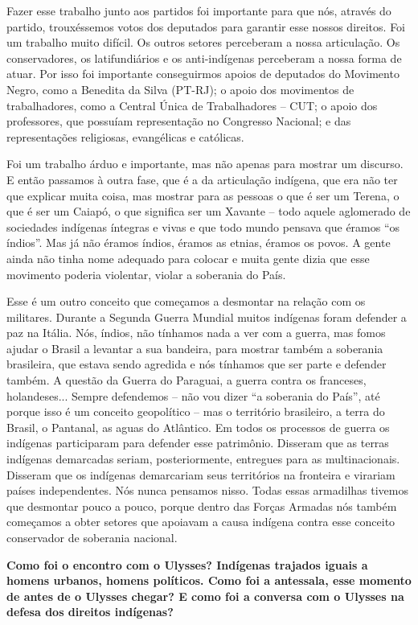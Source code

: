 Fazer esse trabalho junto aos partidos foi importante para que nós,
através do partido, trouxéssemos votos dos deputados para garantir esse
nossos direitos. Foi um trabalho muito difícil. Os outros setores
perceberam a nossa articulação. Os conservadores, os latifundiários e os
anti-indígenas perceberam a nossa forma de atuar. Por isso foi
importante conseguirmos apoios de deputados do Movimento Negro, como a
Benedita da Silva (PT-RJ); o apoio dos movimentos de trabalhadores, como
a Central Única de Trabalhadores -- CUT; o apoio dos professores, que
possuíam representação no Congresso Nacional; e das representações
religiosas, evangélicas e católicas.

Foi um trabalho árduo e importante, mas não apenas para mostrar um
discurso. E então passamos à outra fase, que é a da articulação
indígena, que era não ter que explicar muita coisa, mas mostrar para as
pessoas o que é ser um Terena, o que é ser um Caiapó, o que significa
ser um Xavante -- todo aquele aglomerado de sociedades indígenas
íntegras e vivas e que todo mundo pensava que éramos ``os índios''. Mas
já não éramos índios, éramos as etnias, éramos os povos. A gente ainda
não tinha nome adequado para colocar e muita gente dizia que esse
movimento poderia violentar, violar a soberania do País.

Esse é um outro conceito que começamos a desmontar na relação com os
militares. Durante a Segunda Guerra Mundial muitos indígenas foram
defender a paz na Itália. Nós, índios, não tínhamos nada a ver com a
guerra, mas fomos ajudar o Brasil a levantar a sua bandeira, para
mostrar também a soberania brasileira, que estava sendo agredida e nós
tínhamos que ser parte e defender também. A questão da Guerra do
Paraguai, a guerra contra os franceses, holandeses... Sempre defendemos
-- não vou dizer ``a soberania do País'', até porque isso é um conceito
geopolítico -- mas o território brasileiro, a terra do Brasil, o
Pantanal, as aguas do Atlântico. Em todos os processos de guerra os
indígenas participaram para defender esse patrimônio. Disseram que as
terras indígenas demarcadas seriam, posteriormente, entregues para as
multinacionais. Disseram que os indígenas demarcariam seus territórios
na fronteira e virariam países independentes. Nós nunca pensamos nisso.
Todas essas armadilhas tivemos que desmontar pouco a pouco, porque
dentro das Forças Armadas nós também começamos a obter setores que
apoiavam a causa indígena contra esse conceito conservador de soberania
nacional.

\textbf{Como foi o encontro com o Ulysses? Indígenas trajados iguais a
homens urbanos, homens políticos. Como foi a antessala, esse momento de
antes de o Ulysses chegar? E como foi a conversa com o Ulysses na defesa
dos direitos indígenas?}

